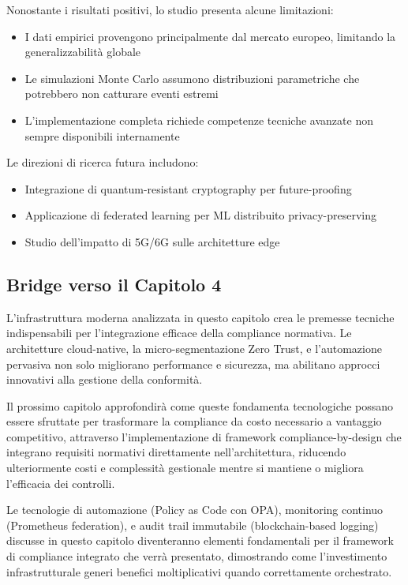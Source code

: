 Nonostante i risultati positivi, lo studio presenta alcune limitazioni:

\begin{itemize}
    \item I dati empirici provengono principalmente dal mercato europeo, limitando la generalizzabilità globale
    \item Le simulazioni Monte Carlo assumono distribuzioni parametriche che potrebbero non catturare eventi estremi
    \item L'implementazione completa richiede competenze tecniche avanzate non sempre disponibili internamente
\end{itemize}

Le direzioni di ricerca futura includono:
\begin{itemize}
    \item Integrazione di quantum-resistant cryptography per future-proofing
    \item Applicazione di federated learning per ML distribuito privacy-preserving
    \item Studio dell'impatto di 5G/6G sulle architetture edge
\end{itemize}

\subsection{\texorpdfstring{\textbf{Bridge verso il Capitolo 4}}{3.8.7 - Bridge verso il Capitolo 4}}

L'infrastruttura moderna analizzata in questo capitolo crea le premesse tecniche indispensabili per l'integrazione efficace della compliance normativa. Le architetture cloud-native, la micro-segmentazione Zero Trust, e l'automazione pervasiva non solo migliorano performance e sicurezza, ma abilitano approcci innovativi alla gestione della conformità.

Il prossimo capitolo approfondirà come queste fondamenta tecnologiche possano essere sfruttate per trasformare la compliance da costo necessario a vantaggio competitivo, attraverso l'implementazione di framework compliance-by-design che integrano requisiti normativi direttamente nell'architettura, riducendo ulteriormente costi e complessità gestionale mentre si mantiene o migliora l'efficacia dei controlli.

Le tecnologie di automazione (Policy as Code con OPA), monitoring continuo (Prometheus federation), e audit trail immutabile (blockchain-based logging) discusse in questo capitolo diventeranno elementi fondamentali per il framework di compliance integrato che verrà presentato, dimostrando come l'investimento infrastrutturale generi benefici moltiplicativi quando correttamente orchestrato.

